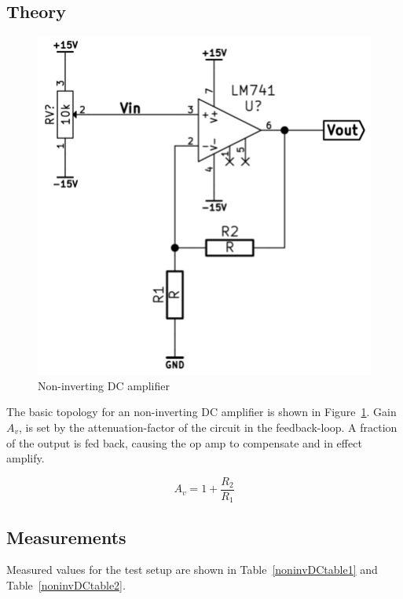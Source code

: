 \documentclass[11pt,a4paper]{article}
\begin{document}
\subsection{Theory}\label{noninvDC-theory}

\begin{figure}[htbp]
    \centering
    \includegraphics[scale=0.5]{img/noninvDCamp.png}
    \caption{Non-inverting DC amplifier}
    \label{fig:noninvDCamp}
\end{figure}

The basic topology for an non-inverting DC amplifier is shown in
Figure~\ref{fig:noninvDCamp}.  Gain $A_v$, is set by the attenuation-factor of
the circuit in the feedback-loop.  A fraction of the output is fed back,
causing the op amp to compensate and in effect amplify.

\begin{equation}
    A_v = 1+\frac{R_2}{R_1}
\end{equation}


\subsection{Measurements}\label{measurements-2}

Measured values for the test setup are shown in Table~\ref{noninvDCtable1} and
Table~\ref{noninvDCtable2}.
\end{document}
